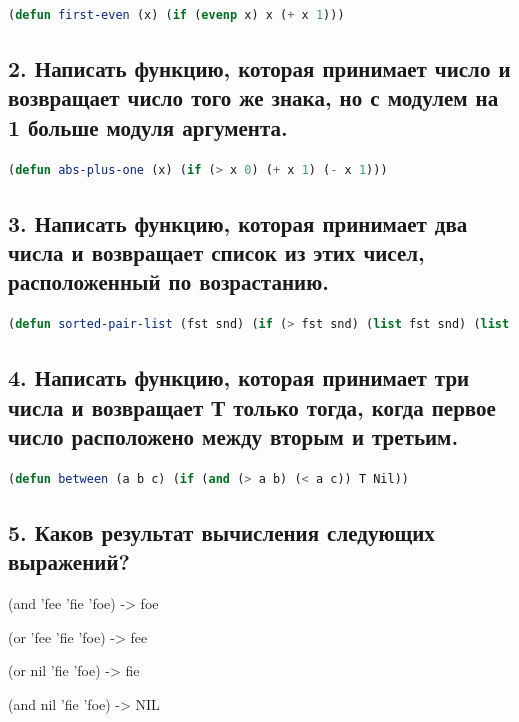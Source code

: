 \documentclass[12pt]{report}
\begin{document}
\begin{lstlisting}[label=6xd, caption=Решение задания №1, language=lisp]
(defun first-even (x) (if (evenp x) x (+ x 1)))
\end{lstlisting}

\subsection*{2. Написать функцию, которая принимает число и возвращает число
	того же знака, но с модулем на 1 больше модуля аргумента.}

\begin{lstlisting}[label=6xd, caption=Решение задания №2, language=lisp]
(defun abs-plus-one (x) (if (> x 0) (+ x 1) (- x 1)))
\end{lstlisting}

\subsection*{3. Написать функцию, которая принимает два числа и возвращает
	список из этих чисел, расположенный по возрастанию.}

\begin{lstlisting}[label=6xd, caption=Решение задания №3, language=lisp]
(defun sorted-pair-list (fst snd) (if (> fst snd) (list fst snd) (list snd fst)))
\end{lstlisting}

\subsection*{4. Написать функцию, которая принимает три числа и возвращает Т только
	тогда, когда первое число расположено между вторым и третьим.}

\begin{lstlisting}[label=6xd, caption=Решение задания №4, language=lisp]
(defun between (a b c) (if (and (> a b) (< a c)) T Nil))
\end{lstlisting}

\subsection*{5. Каков результат вычисления следующих выражений?}

(and 'fee 'fie 'foe) -> foe

(or 'fee 'fie 'foe) -> fee

(or nil 'fie 'foe) -> fie

(and nil 'fie 'foe) -> NIL
\end{document}
